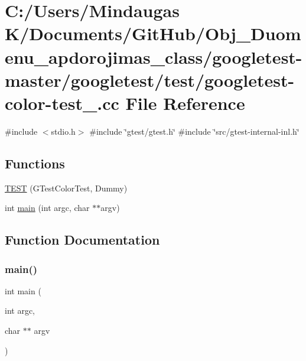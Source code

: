 \hypertarget{googletest-master_2googletest_2test_2googletest-color-test___8cc}{}\section{C\+:/\+Users/\+Mindaugas K/\+Documents/\+Git\+Hub/\+Obj\+\_\+\+Duomenu\+\_\+apdorojimas\+\_\+class/googletest-\/master/googletest/test/googletest-\/color-\/test\+\_\+.cc File Reference}
\label{googletest-master_2googletest_2test_2googletest-color-test___8cc}
{\ttfamily \#include $<$stdio.\+h$>$}\newline
{\ttfamily \#include \char`\"{}gtest/gtest.\+h\char`\"{}}\newline
{\ttfamily \#include \char`\"{}src/gtest-\/internal-\/inl.\+h\char`\"{}}\newline
\subsection*{Functions}
\begin{DoxyCompactItemize}
\item 
\mbox{\hyperlink{googletest-master_2googletest_2test_2googletest-color-test___8cc_a78903f80b07f944e7aa466ebdff1d644}{T\+E\+ST}} (G\+Test\+Color\+Test, Dummy)
\item 
int \mbox{\hyperlink{googletest-master_2googletest_2test_2googletest-color-test___8cc_a3c04138a5bfe5d72780bb7e82a18e627}{main}} (int argc, char $\ast$$\ast$argv)
\end{DoxyCompactItemize}


\subsection{Function Documentation}
\mbox{\label{googletest-master_2googletest_2test_2googletest-color-test___8cc_a3c04138a5bfe5d72780bb7e82a18e627}} 
\subsubsection{\texorpdfstring{main()}{main()}}
{\footnotesize\ttfamily int main (\begin{DoxyParamCaption}\item[{int}]{argc,  }\item[{char $\ast$$\ast$}]{argv }\end{DoxyParamCaption})}

